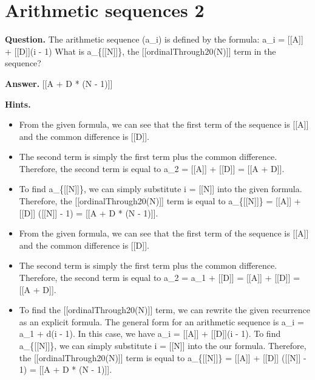 \documentclass{article}
\begin{document}
\section*{Arithmetic sequences 2}
\textbf{Question.} The arithmetic sequence (a\_i) is defined by the formula:
                a\_i = [[A]] + [[D]](i - 1)
                What is a\_\{[[N]]\}, the [[ordinalThrough20(N)]] term in the sequence?

\textbf{Answer.} [[A + D * (N - 1)]]

\textbf{Hints.}
\begin{itemize}
  \item From the given formula, we can see that the first term of the sequence is [[A]] and the common difference is [[D]].
  \item The second term is simply the first term plus the common difference.
                    Therefore, the second term is equal to a\_2 = [[A]] + [[D]] = [[A + D]].
  \item To find a\_\{[[N]]\}, we can simply substitute i = [[N]] into the given formula.
                    Therefore, the [[ordinalThrough20(N)]] term is equal to a\_\{[[N]]\} = [[A]] + [[D]] ([[N]] - 1) = [[A + D * (N - 1)]].
  \item From the given formula, we can see that the first term of the sequence is [[A]] and the common difference is [[D]].
  \item The second term is simply the first term plus the common difference.
                    Therefore, the second term is equal to a\_2 = a\_1 + [[D]] = [[A]] + [[D]] = [[A + D]].
  \item To find the [[ordinalThrough20(N)]] term, we can rewrite the given recurrence as an explicit formula.
                    The general form for an arithmetic sequence is a\_i = a\_1 + d(i - 1). In this case, we have a\_i = [[A]] + [[D]](i - 1).
                    To find a\_\{[[N]]\}, we can simply substitute i = [[N]] into the our formula.
                    Therefore, the [[ordinalThrough20(N)]] term is equal to a\_\{[[N]]\} = [[A]] + [[D]] ([[N]] - 1) = [[A + D * (N - 1)]].
\end{itemize}
\end{document}
